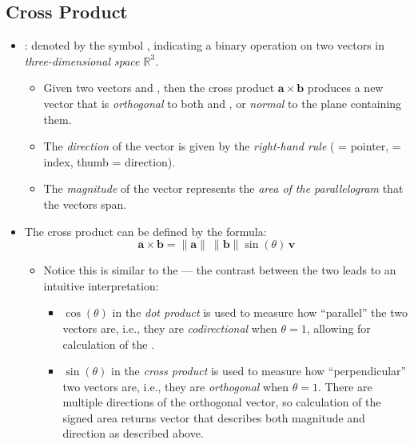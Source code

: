 \begin{itemize}
  \subsection{Cross Product}\label{Cross Product}
  \begin{itemize}
    \item {}: denoted by the symbol \jjj{\(\bm{\times} \)}, indicating a binary operation on two vectors in \emph{three-dimensional space \(\mathbb{R}^3 \)}.
      \begin{itemize}
        \item Given two \hyperref[tbd]{} vectors  and , then the cross product \(\bm{a}\times\bm{b}\) produces a new vector that is \emph{orthogonal} to both  and , or \emph{normal} to the plane containing them.
        \item The \emph{direction} of the vector is given by the \emph{right-hand rule} ( = pointer,  = index, thumb = direction). 
        \item The \emph{magnitude} of the vector represents the \emph{area of the parallelogram} that the vectors span.
      \end{itemize}
    \item The cross product can be defined by the formula: 
    \[%
    \bm{a}\times \bm{b} = \| \bm{a} \|~\| \bm{b} \|\sin(\theta)\,\bm{v}
    \]%
    \begin{itemize}
      \item Notice this is similar to the \hyperref[Geometric Interpretation of the Dot Product]{} --- the contrast between the two leads to an intuitive interpretation:
      \begin{itemize}
        \item \(\cos(\theta)\) in the \emph{dot product} is used to measure how ``parallel'' the two vectors are, i.e., they are \emph{codirectional} when \(\theta = 1\), allowing for calculation of the \hyperref[Vector Length]{}. 
        \item \(\sin(\theta)\) in the \emph{cross product} is used to measure how ``perpendicular'' two vectors are, i.e., they are \emph{orthogonal} when \(\theta = 1\). There are multiple directions of the orthogonal vector, so calculation of the signed area returns vector  that describes both magnitude and direction as described above.

\end{itemize}
\end{itemize}
\end{itemize}
\end{itemize}
